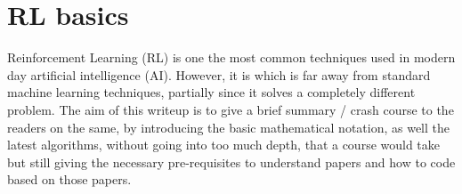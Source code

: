 \chapter{RL basics}
\par
Reinforcement Learning (RL) is one the most common techniques used in modern day artificial intelligence (AI). However, it is  which is far away from standard machine learning techniques, partially since it solves a completely different problem. The aim of this writeup is to give a brief summary / crash course to the readers on the same, by introducing the basic mathematical notation, as well the latest algorithms, without going into too much depth, that a course would take but still giving the necessary pre-requisites to understand papers and how to code based on those papers. 
